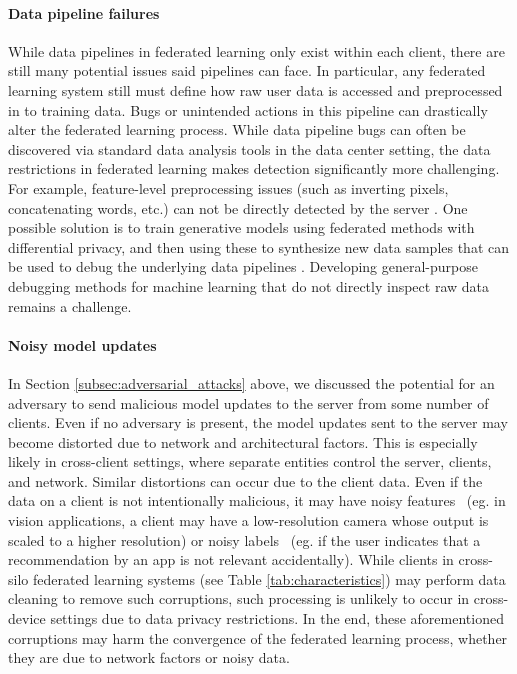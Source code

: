 \paragraph{Data pipeline failures}\label{p:pipeline-failures}
While data pipelines in federated learning only exist within each client, there are still many potential issues said pipelines can face. In particular, any federated learning system still must define how raw user data is accessed and preprocessed in to training data. Bugs or unintended actions in this pipeline can drastically alter the federated learning process. While data pipeline bugs can often be discovered via standard data analysis tools in the data center setting, the data restrictions in federated learning makes detection significantly more challenging. For example, feature-level preprocessing issues (such as inverting pixels, concatenating words, etc.) can not be directly detected by the server \citep{augenstein2019generative}. One possible solution is to train generative models using federated methods with differential privacy, and then using these to synthesize new data samples that can be used to debug the underlying data pipelines \citep{augenstein2019generative}. Developing general-purpose debugging methods for machine learning that do not directly inspect raw data remains a challenge.

\paragraph{Noisy model updates}\label{p:noisy-model-updates}
In Section \ref{subsec:adversarial_attacks} above, we discussed the potential for an adversary to send malicious model updates to the server from some number of clients. Even if no adversary is present, the model updates sent to the server may become distorted due to network and architectural factors. This is especially likely in cross-client settings, where separate entities control the server, clients, and network. Similar distortions can occur due to the client data. Even if the data on a client is not intentionally malicious, it may have noisy features~\citep{mnih2012learning} (eg. in vision applications, a client may have a low-resolution camera whose output is scaled to a higher resolution) or noisy labels~\citep{natarajan2013learning} (eg. if the user indicates that a recommendation by an app is not relevant accidentally). While clients in cross-silo federated learning systems (see Table \ref{tab:characteristics}) may perform data cleaning to remove such corruptions, such processing is unlikely to occur in cross-device settings due to data privacy restrictions. In the end, these aforementioned corruptions may harm the convergence of the federated learning process, whether they are due to network factors or noisy data.

